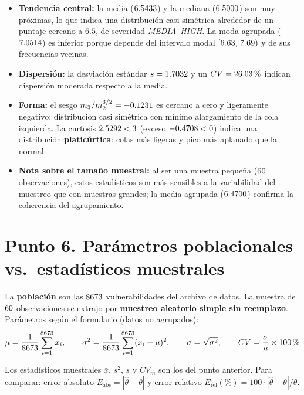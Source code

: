 \documentclass[11pt,a4paper]{article}
\newcommand{\FP}{\text{[F]}}
\begin{document}
\begin{itemize}
  \item \textbf{Tendencia central:} la media ($6.5433$) y la mediana
        ($6.5000$) son muy próximas, lo que indica una distribución casi
        simétrica alrededor de un puntaje cercano a $6.5$, de severidad
        \emph{MEDIA}--\emph{HIGH}. La moda agrupada ($7.0514$) es inferior
        porque depende del intervalo modal $[6.63,\,7.69)$ y de sus
        frecuencias vecinas.
  \item \textbf{Dispersión:} la desviación estándar $s=1.7032$ y un
        $CV=26.03\,\text{\%}$ indican dispersión moderada respecto a la media.
  \item \textbf{Forma:} el sesgo $m_3/m_2^{3/2}=-0.1231$ es cercano a cero y
        ligeramente negativo: distribución casi simétrica con mínimo
        alargamiento de la cola izquierda. La curtosis $2.5292<3$ (exceso
        $-0.4708<0$) indica una distribución \textbf{platicúrtica}: colas
        más ligeras y pico más aplanado que la normal.
  \item \textbf{Nota sobre el tamaño muestral:} al ser una muestra pequeña
        ($60$ observaciones), estos estadísticos son más sensibles a la
        variabilidad del muestreo que con muestras grandes; la media agrupada
        ($6.4700$) confirma la coherencia del agrupamiento.
\end{itemize}

\section{Punto 6. Parámetros poblacionales vs.\ estadísticos muestrales}

La \textbf{población} son las $8673$ vulnerabilidades del archivo de datos.
La muestra de $60$ observaciones se extrajo por \textbf{muestreo
aleatorio simple sin reemplazo}. Parámetros según el formulario \FP (datos no
agrupados):
\[
\mu = \frac{1}{8673}\sum_{i=1}^{8673} x_i,
\qquad
\sigma^{2} = \frac{1}{8673}\sum_{i=1}^{8673}(x_i-\mu)^{2},
\qquad
\sigma = \sqrt{\sigma^{2}},
\qquad
CV = \frac{\sigma}{\mu}\times 100\,\text{\%}
\]

Los estadísticos muestrales $\bar{x}$, $s^{2}$, $s$ y $CV_m$ son los del
punto anterior. Para comparar: error absoluto
$E_{\text{abs}}=|\hat\theta-\theta|$ y error relativo
$E_{\text{rel}}(\%) = 100\cdot|\hat\theta-\theta|/\theta$.
\end{document}

